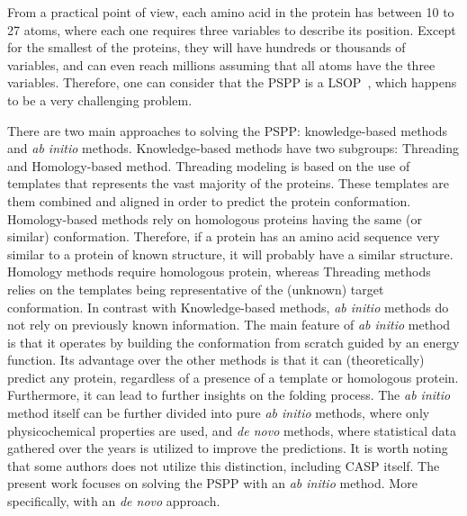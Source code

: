 From a practical point of view, each amino acid in the protein has between 10
to 27 atoms, where each one requires three variables to describe its position.
Except for the smallest of the proteins, they will have hundreds or thousands
of variables, and can even reach millions assuming that all atoms have the
three variables. Therefore, one can consider that the \ac{PSPP} is a
\ac{LSOP}~\cite{mahdavi2015metaheuristics}, which happens to be a very
challenging problem.

There are two main approaches to solving the \ac{PSPP}: knowledge-based methods
and \textit{ab initio} methods. Knowledge-based methods have two subgroups:
Threading and Homology-based method. Threading modeling is based on the use of
templates that represents the vast majority of the proteins. These templates
are them combined and aligned in order to predict the protein conformation.
Homology-based methods rely on homologous proteins having the same (or similar)
conformation. Therefore, if a protein has an amino acid sequence very similar
to a protein of known structure, it will probably have a similar structure.
Homology methods require homologous protein, whereas Threading methods relies
on the templates being representative of the (unknown) target conformation. In
contrast with Knowledge-based methods, \textit{ab initio} methods do not rely
on previously known information. The main feature of \textit{ab initio}
method is that it operates by building the conformation from scratch guided by
an energy function. Its advantage over the other
methods is that it can (theoretically) predict any protein, regardless of a
presence of a template or homologous protein. Furthermore, it can lead to
further insights on the folding process. The \textit{ab initio} method itself
can be further divided into pure \textit{ab initio} methods, where only
physicochemical properties are used, and \textit{de novo} methods, where
statistical data gathered over the years is utilized to improve the predictions.
It is worth noting that some authors does not utilize this distinction, including
CASP itself. The present work focuses on solving the \ac{PSPP} with an
\textit{ab initio} method. More specifically, with an \textit{de novo} approach.

